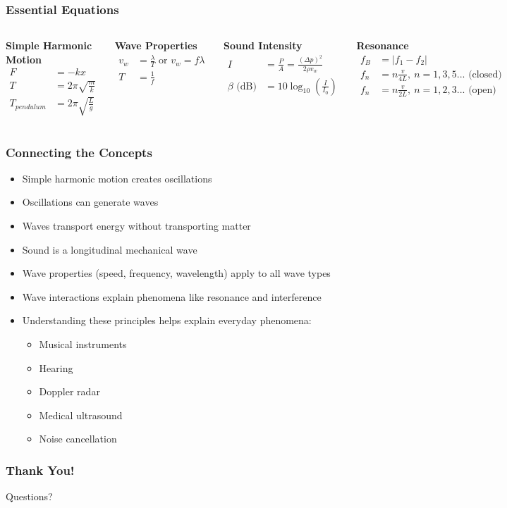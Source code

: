 \documentclass{beamer}
\begin{document}
\begin{frame}
\frametitle{Essential Equations}
\begin{columns}
\textbf{Simple Harmonic Motion}
\begin{align}
F &= -kx \\
T &= 2\pi\sqrt{\frac{m}{k}} \\
T_{pendulum} &= 2\pi\sqrt{\frac{L}{g}}
\end{align}

\textbf{Wave Properties}
\begin{align}
v_w &= \frac{\lambda}{T} \text{ or } v_w = f\lambda \\
T &= \frac{1}{f}
\end{align}

\textbf{Sound Intensity}
\begin{align}
I &= \frac{P}{A} = \frac{(\Delta p)^2}{2\rho v_w} \\
\beta \text{ (dB)} &= 10 \log_{10}\left(\frac{I}{I_0}\right)
\end{align}

\textbf{Resonance}
\begin{align}
f_B &= |f_1 - f_2| \\
f_n &= n\frac{v}{4L}, \: n = 1,3,5... \text{ (closed)} \\
f_n &= n\frac{v}{2L}, \: n = 1,2,3... \text{ (open)}
\end{align}
\end{columns}
\end{frame}

\begin{frame}
\frametitle{Connecting the Concepts}
\begin{itemize}
\item Simple harmonic motion creates oscillations
\item Oscillations can generate waves
\item Waves transport energy without transporting matter
\item Sound is a longitudinal mechanical wave
\item Wave properties (speed, frequency, wavelength) apply to all wave types
\item Wave interactions explain phenomena like resonance and interference
\item Understanding these principles helps explain everyday phenomena:
\begin{itemize}
\item Musical instruments
\item Hearing
\item Doppler radar
\item Medical ultrasound
\item Noise cancellation
\end{itemize}
\end{itemize}
\end{frame}

\begin{frame}
\frametitle{Thank You!}
\begin{center}
\Large Questions?
\end{center}
\end{frame}
\end{document}
